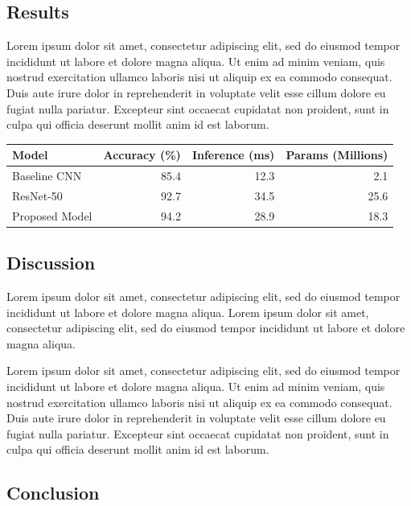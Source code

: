 \documentclass[
]{article}
\newcounter{none} %
\begin{document}
\subsection{Results}\label{results}

Lorem ipsum dolor sit amet, consectetur adipiscing elit, sed do eiusmod
tempor incididunt ut labore et dolore magna aliqua. Ut enim ad minim
veniam, quis nostrud exercitation ullamco laboris nisi ut aliquip ex ea
commodo consequat. Duis aute irure dolor in reprehenderit in voluptate
velit esse cillum dolore eu fugiat nulla pariatur. Excepteur sint
occaecat cupidatat non proident, sunt in culpa qui officia deserunt
mollit anim id est laborum.

{\def\LTcaptype{none} %
\begin{longtable}[]{@{}lrrr@{}}
\toprule\noalign{}
Model & Accuracy (\%) & Inference (ms) & Params (Millions) \\
\midrule\noalign{}
\endhead
\bottomrule\noalign{}
\endlastfoot
Baseline CNN & 85.4 & 12.3 & 2.1 \\
ResNet-50 & 92.7 & 34.5 & 25.6 \\
Proposed Model & 94.2 & 28.9 & 18.3 \\
\end{longtable}
}

\subsection{Discussion}\label{discussion}

Lorem ipsum dolor sit amet, consectetur adipiscing elit, sed do eiusmod
tempor incididunt ut labore et dolore magna aliqua. Lorem ipsum dolor
sit amet, consectetur adipiscing elit, sed do eiusmod tempor incididunt
ut labore et dolore magna aliqua.

Lorem ipsum dolor sit amet, consectetur adipiscing elit, sed do eiusmod
tempor incididunt ut labore et dolore magna aliqua. Ut enim ad minim
veniam, quis nostrud exercitation ullamco laboris nisi ut aliquip ex ea
commodo consequat. Duis aute irure dolor in reprehenderit in voluptate
velit esse cillum dolore eu fugiat nulla pariatur. Excepteur sint
occaecat cupidatat non proident, sunt in culpa qui officia deserunt
mollit anim id est laborum.

\subsection{Conclusion}\label{conclusion}
\end{document}
